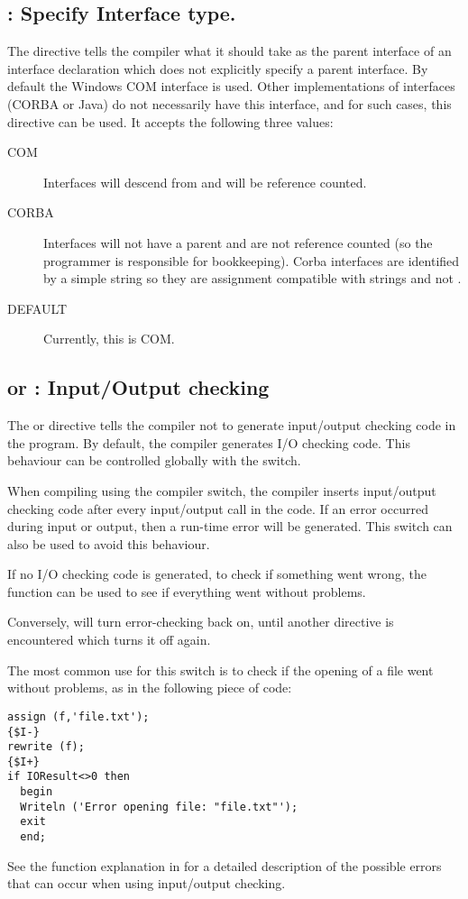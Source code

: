 \subsection{ : Specify Interface type.}
The  directive tells the compiler what it should take
as the parent interface of an interface declaration which does not
explicitly specify a parent interface. By default the Windows COM 
interface is used. Other implementations of interfaces (CORBA or Java) do
not necessarily have this interface, and for such cases, this directive can
be used. It accepts the following three values:
\begin{description}
\item[COM] Interfaces will descend from  and will be reference
counted.
\item[CORBA] Interfaces will not have a parent and are not reference
counted (so the programmer is responsible for bookkeeping). 
Corba interfaces are identified by a simple string so they are assignment compatible 
with strings and not .
\item[DEFAULT] Currently, this is COM.
\end{description}

\subsection{ or  : Input/Output checking}

The  or  directive tells the compiler
not to generate input/output checking code in the program. By default, the
compiler generates I/O checking code. This behaviour can be controlled
globally with the  switch.

When compiling using the  compiler switch, the \fpc compiler inserts
input/output checking code after every input/output call in the code.
If an error occurred during input or output, then a run-time error will
be generated. This switch can also be used to avoid this behaviour.

If no I/O checking code is generated, to check if something went wrong, 
the  function can be used to see if everything went without 
problems.

Conversely,  will turn error-checking back on, until another
directive is encountered which turns it off again.

The most common use for this switch is to check if the opening of a file
went without problems, as in the following piece of code:
\begin{verbatim}
assign (f,'file.txt');
{$I-}
rewrite (f);
{$I+}
if IOResult<>0 then
  begin
  Writeln ('Error opening file: "file.txt"');
  exit
  end;
\end{verbatim}
See the  function explanation in  for a
detailed description of the possible errors that can occur when using
input/output checking.

